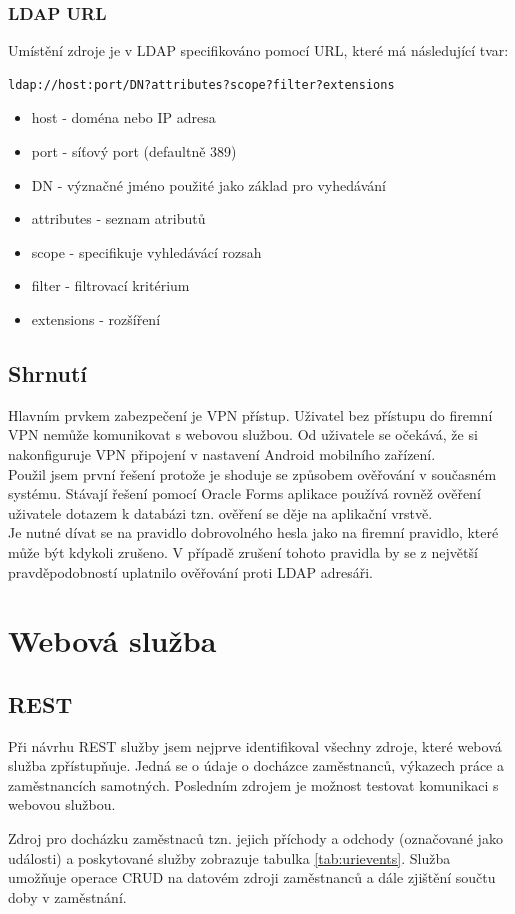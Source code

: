 \documentclass{diplomka}
\begin{document}
\subsection*{LDAP URL}
Umístění zdroje je v LDAP specifikováno pomocí URL, které má následující tvar:
\begin{verbatim}
ldap://host:port/DN?attributes?scope?filter?extensions
\end{verbatim}
\begin{itemize}[noitemsep,nolistsep]
\item host - doména nebo IP adresa
\item port - síťový port (defaultně 389)
\item DN - význačné jméno použité jako základ pro vyhedávání
\item attributes -  seznam atributů
\item scope - specifikuje vyhledávácí rozsah  
\item filter - filtrovací kritérium
\item extensions - rozšíření
\end{itemize}

\section{Shrnutí}
Hlavním prvkem zabezpečení je VPN přístup. Uživatel bez přístupu do firemní VPN nemůže komunikovat s webovou službou. Od uživatele se očekává, že si nakonfiguruje VPN připojení v nastavení Android mobilního zařízení.\\ \indent
Použil jsem první řešení protože je shoduje se způsobem ověřování v současném systému. Stávají řešení pomocí Oracle Forms aplikace používá rovněž ověření uživatele dotazem k databázi tzn. ověření se děje na aplikační vrstvě. \\ \indent
Je nutné dívat se na pravidlo dobrovolného hesla jako na firemní pravidlo, které může být kdykoli zrušeno. V případě zrušení tohoto pravidla by se z největší pravděpodobností uplatnilo ověřování proti LDAP adresáři. 

\chapter{Webová služba}

\section{REST}
Při návrhu REST služby jsem nejprve identifikoval všechny zdroje, které webová služba zpřístupňuje. Jedná se o údaje o docházce zaměstnanců, výkazech práce a zaměstnancích samotných. Posledním zdrojem je možnost testovat komunikaci s webovou službou. \par
Zdroj pro docházku zaměstnaců tzn. jejich příchody a odchody (označované jako události) a poskytované služby zobrazuje tabulka \ref{tab:urievents}. Služba umožňuje operace CRUD na datovém zdroji zaměstnanců a dále zjištění součtu doby v zaměstnání.
\end{document}
